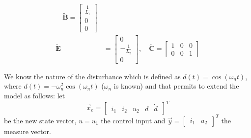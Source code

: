 \documentclass[11pt,a4paper,oneside]{book}
\numberwithin{equation}{section}
\theoremstyle{it}
\theoremstyle{definition}
\begin{document}
\begin{mybox}
\begin{equation*}
\begin{aligned}
			\quad 
			\tilde{\mathbf{B}} = \begin{bmatrix}
				\frac{1}{L_1} \\[6pt]
				0 \\[6pt]
				0
			\end{bmatrix} \\[6pt]
			\tilde{\mathbf{E}} &= \begin{bmatrix}
				0 \\[6pt]
				-\frac{1}{L_2} \\[6pt]
				0
			\end{bmatrix}, \quad \tilde{\mathbf{C}} = 
			\begin{bmatrix}
				1 & 0 & 0 \\[6pt]
				0 & 0 & 1
			\end{bmatrix}
		\end{aligned}
	\end{equation*}
	
\end{mybox}
We know the nature of the disturbance which is defined as $d(t) = \cos(\omega_n 
t)$, where $\ddot{d}(t) = -\omega_n^2\cos(\omega_n t)$ ($\omega_n$ is known) 
and that permits to extend the model as follows: let 
$$\vec{x}_{e}=\begin{bmatrix}\, i_1 & i_2 & u_2 & d & \dot{d}\,\end{bmatrix}^T$$ 
be the new state vector, $u=u_1$ the control input and 
$\vec{y}=\begin{bmatrix}\,i_1 & u_2\,\end{bmatrix}^T$ the measure vector.\\
\end{document}
